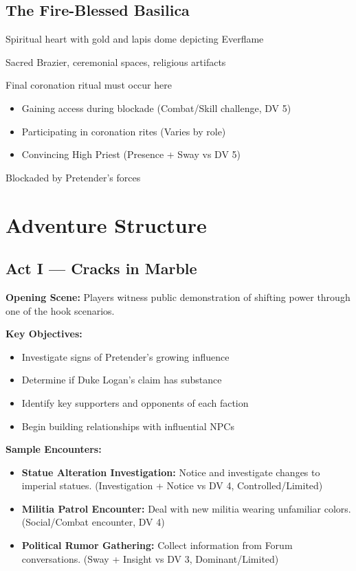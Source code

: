 \documentclass[11pt]{article}
\newenvironment{location}[1]{\begin{description}[leftmargin=*,style=standard]\item[\textbf{#1}]}{\end{description}}
\begin{document}
\subsection{The Fire-Blessed Basilica}
\begin{location}{The Fire-Blessed Basilica}
\item[Description:] Spiritual heart with gold and lapis dome depicting Everflame
\item[Features:] Sacred Brazier, ceremonial spaces, religious artifacts
\item[Importance:] Final coronation ritual must occur here
\item[Challenges:] 
  \begin{itemize}
    \item Gaining access during blockade (Combat/Skill challenge, DV 5)
    \item Participating in coronation rites (Varies by role)
    \item Convincing High Priest (Presence + Sway vs DV 5)
  \end{itemize}
\item[Current Status:] Blockaded by Pretender's forces
\end{location}

\section{Adventure Structure}

\subsection{Act I --- Cracks in Marble}

\textbf{Opening Scene:} Players witness public demonstration of shifting power through one of the hook scenarios.

\textbf{Key Objectives:}
\begin{itemize}
\item Investigate signs of Pretender's growing influence
\item Determine if Duke Logan's claim has substance
\item Identify key supporters and opponents of each faction
\item Begin building relationships with influential NPCs
\end{itemize}

\textbf{Sample Encounters:}
\begin{itemize}
\item \textbf{Statue Alteration Investigation:} Notice and investigate changes to imperial statues. (Investigation + Notice vs DV 4, Controlled/Limited)
\item \textbf{Militia Patrol Encounter:} Deal with new militia wearing unfamiliar colors. (Social/Combat encounter, DV 4)
\item \textbf{Political Rumor Gathering:} Collect information from Forum conversations. (Sway + Insight vs DV 3, Dominant/Limited)
\end{itemize}
\end{document}
